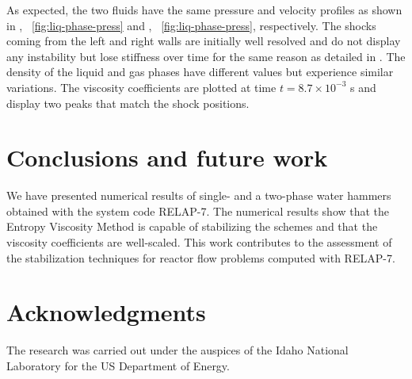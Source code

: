 \documentclass{mc2015}
\begin{document}
As expected, the two fluids have the same pressure and velocity profiles as shown in , ~\ref{fig:liq-phase-press} and , ~\ref{fig:liq-phase-press}, respectively. The shocks coming from the left and right walls are initially well resolved and do not display any instability but lose stiffness over time for the same reason as detailed in . The density of the liquid and gas phases have different values but experience similar variations. The viscosity coefficients are plotted at time $t = 8.7 \times 10^{-3}$ s and display two peaks that match the shock positions.
%
\section{Conclusions and future work}\label{sec:conclusion}
%
We have presented numerical results of single- and a two-phase water hammers obtained with the system code RELAP-7. The numerical results show that the Entropy Viscosity Method is capable of stabilizing the schemes and that the viscosity coefficients are well-scaled. This work contributes to the assessment of the stabilization techniques for reactor flow problems computed with RELAP-7.

\section{Acknowledgments}

The research was carried out under the auspices of the Idaho National Laboratory for the US Department of Energy.

\setlength{\baselineskip}{12pt}



\end{document}
